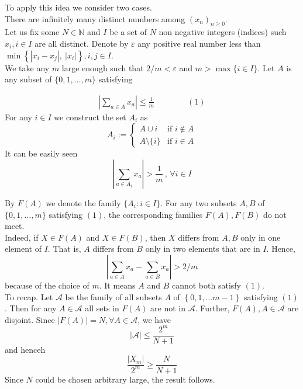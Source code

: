 \begin{solution}[dgrozev]
    To apply this idea we consider two cases.\\

     There are infinitely many distinct numbers among
    $(x_n)_{n\ge 0}$. \\

    Let us fix some $N\in\mathbb{N}$ and $I$ be a set of $N$ non negative
    integers (indices) such $x_i, i\in I$ are all distinct. Denote by
    $\varepsilon$ any positive real number less than $\min \left\{|x_i-x_j|,\
    |x_i|\right\}, i, j\in I$. \\

    We take any $m$ large enough such that $2/m<\varepsilon$ and $m>\max\{i\in
    I\}$. Let $A$ is any subset of $\{0,1,\dots,m\}$ satisfying

    \begin{align*}
        \left|\sum_{a\in A}x_a\right |\leq \frac{1}{m}\qquad\qquad (1) 
    \end{align*}
    For any $i\in I$ we construct the set $A_i$ as
    \[A_i:=\begin{cases} A\cup {i}& \text{if } i\not\in A\\
    A\setminus\{i\}&\text{if } i\in A \end{cases} \]
    It can be easily seen
    \[\displaystyle \left|\sum_{a\in A_i}x_a\right |> \frac{1}{m}\,,\,\forall
    i\in I\]

    By $F(A)$ we denote the family $\{A_i:i\in I\}$. For any two subsets $A,B$
    of $\{0,1,\dots,m\}$ satisfying $(1)$, {\color{impC}the corresponding families $F(A),
    F(B)$ do not meet}.\\

    Indeed, if $X\in F(A)$ and $X\in F(B)$, then $X$
    differs from $A, B$ only in one element of $I$. That is, $A$
    differs from $B$ only in two elements that are in $I$. Hence,
    \[\left|\sum_{a\in A}x_a-\sum_{a\in B}x_a\right|>2/m\]
    because of the choice of $m$. It means $A$ and $B$ cannot both satisfy
    $(1)$.\\

    To recap. Let $\mathcal{A}$ be the family of all subsets $A$ of $\left\{0,
    1,\dots m-1\right\}$ satisfying $(1)$. Then for any $A\in\mathcal{A}$ all
    sets in $F(A)$ are not in $\mathcal{A}$. Further, $F(A), A\in \mathcal{A}$
    are disjoint. Since $|F(A)|=N,\forall A\in\mathcal{A}$, we have
    \[|\mathcal{A}|\leq \frac{2^m}{N+1}\]and henceh
    \[\displaystyle \frac{|X_m|}{2^m}\geq \frac{N}{N+1}\]
    Since $N$ could be chosen arbitrary large, the result follows.\\


\end{solution}

